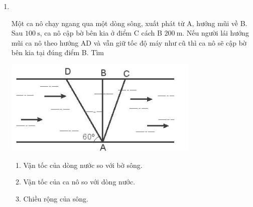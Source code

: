 \begin{enumerate}[label=\bfseries Bài \arabic*:,leftmargin=1.5cm]
\item {}\\
{	Một ca nô chạy ngang qua một dòng sông, xuất phát từ A, hướng mũi về B. Sau $\SI{100}{\second}$, ca nô cập bờ bên kia ở điểm C cách B $\SI{200}{\meter}$. Nếu người lái hướng mũi ca nô theo hướng AD và vẫn giữ tốc độ máy như cũ thì ca nô sẽ cập bờ bên kia tại đúng điểm B. Tìm
	\begin{center}
		\includegraphics[width=0.35\linewidth]{../figs/VN10-2023-PH-TP0002-8}
	\end{center}
		\begin{enumerate}[label=\alph*)]
			\item Vận tốc của dòng nước so với bờ sông.
			\item Vận tốc của ca nô so với dòng nước.
			\item Chiều rộng của sông.
		\end{enumerate}
}
\end{enumerate}
